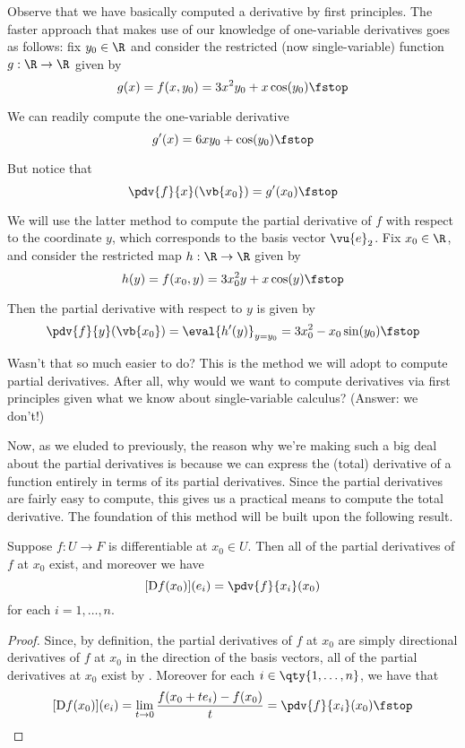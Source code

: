 Observe that we have basically computed a derivative by first principles. The faster approach that makes use of our knowledge of one-variable derivatives goes as follows: fix \( y_0\in\R \) and consider the restricted (now single-variable) function \( g:\R\to\R \) given by
\[ g(x)=f(x,y_0)=3x^2y_0+x\cos(y_0)\fstop \]

We can readily compute the one-variable derivative
\[ g'(x)=6xy_0+\cos(y_0)\fstop \]

But notice that
\[ {\pdv{f}{x}}(\vb{x_0})=g'(x_0)\fstop \]

We will use the latter method to compute the partial derivative of \( f \) with respect to the coordinate \( y \), which corresponds to the basis vector \( \vu{e}_2 \). Fix \( x_0\in\R \), and consider the restricted map \( h:\R\to\R \) given by
\[ h(y)=f(x_0,y)=3x_0^2y+x\cos(y)\fstop \]

Then the partial derivative with respect to \( y \) is given by
\[ {\pdv{f}{y}}(\vb{x_0})=\eval{h'(y)}_{y=y_0}=3x_0^2-x_0\sin(y_0)\fstop \]

Wasn't that so much easier to do? This is the method we will adopt to compute partial derivatives. After all, why would we want to compute derivatives via first principles given what we know about single-variable calculus? (Answer: we don't!)

\vspace{3mm}

Now, as we eluded to previously, the reason why we're making such a big deal about the partial derivatives is because we can express the (total) derivative of a function entirely in terms of its partial derivatives. Since the partial derivatives are fairly easy to compute, this gives us a practical means to compute the total derivative. The foundation of this method will be built upon the following result.

\begin{corollary}
  Suppose \( f:U\to F \) is differentiable at \( x_0\in U \). Then all of the partial derivatives of \( f \) at \( x_0 \) exist, and moreover we have
  \[ [\D f(x_0)](e_i)={\pdv{f}{x_i}}(x_0) \]
  for each \( i=1,\dots, n \).
\end{corollary}
\begin{proof}
  Since, by definition, the partial derivatives of \( f \) at \( x_0 \) are simply directional derivatives of \( f \) at \( x_0 \) in the direction of the basis vectors, all of the partial derivatives at \( x_0 \) exist by . Moreover for each \( i\in\qty{1,\dots,n} \), we have that
  \[ [\D f(x_0)](e_i)=\lim_{t\to 0}\frac{f(x_0+te_i)-f(x_0)}{t}={\pdv{f}{x_i}} (x_0)\fstop \]
\end{proof}

